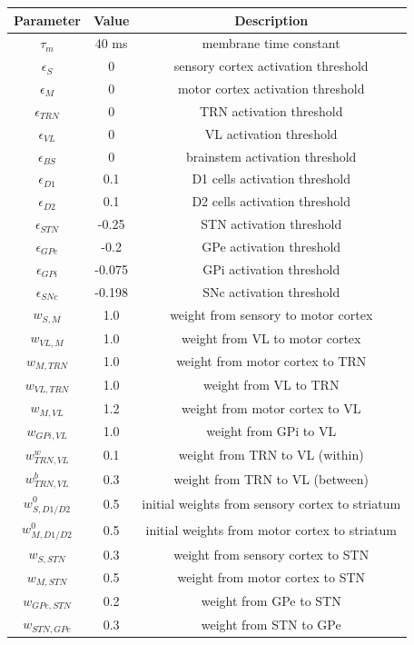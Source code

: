 \documentclass[a4paper]{scrreprt}
\begin{document}
\begin{center}
\begin{tabular}{ c  c  c }
\hline
Parameter & Value & Description\\
\hline
$\tau_m$ & 40 ms & membrane time constant\\
$\epsilon_S$ & 0 & sensory cortex activation threshold\\
$\epsilon_M$ & 0 & motor cortex activation threshold\\
$\epsilon_{TRN}$ & 0 & TRN activation threshold\\
$\epsilon_{VL}$ & 0 & VL activation threshold\\
$\epsilon_{BS}$ & 0 & brainstem activation threshold\\
$\epsilon_{D1}$ & 0.1 & D1 cells activation threshold\\
$\epsilon_{D2}$ & 0.1 & D2 cells activation threshold\\
$\epsilon_{STN}$ & -0.25 & STN activation threshold\\
$\epsilon_{GPe}$ & -0.2 & GPe activation threshold\\
$\epsilon_{GPi}$ & -0.075 & GPi activation threshold\\
$\epsilon_{SNc}$ & -0.198 & SNc activation threshold\\
$w_{S,M}$ & 1.0 & weight from sensory to motor cortex\\
$w_{VL,M}$ & 1.0 & weight from VL to motor cortex\\
$w_{M,TRN}$ & 1.0 & weight from motor cortex to TRN\\
$w_{VL,TRN}$ & 1.0 & weight from VL to TRN\\
$w_{M,VL}$ & 1.2 & weight from motor cortex to VL\\
$w_{GPi,VL}$ & 1.0 & weight from GPi to VL\\
$w_{TRN,VL}^w$ & 0.1 & weight from TRN to VL (within)\\
$w_{TRN,VL}^b$ & 0.3 & weight from TRN to VL (between)\\
$w_{S,D1/D2}^0$ & 0.5 & initial weights from sensory cortex to striatum\\
$w_{M,D1/D2}^0$ & 0.5 & initial weights from motor cortex to striatum\\
$w_{S,STN}$ & 0.3 & weight from sensory cortex to STN\\
$w_{M,STN}$ & 0.5 & weight from motor cortex to STN\\
$w_{GPe,STN}$ & 0.2 & weight from GPe to STN\\
$w_{STN,GPe}$ & 0.3 & weight from STN to GPe\\

\end{tabular}
\end{center}
\end{document}
